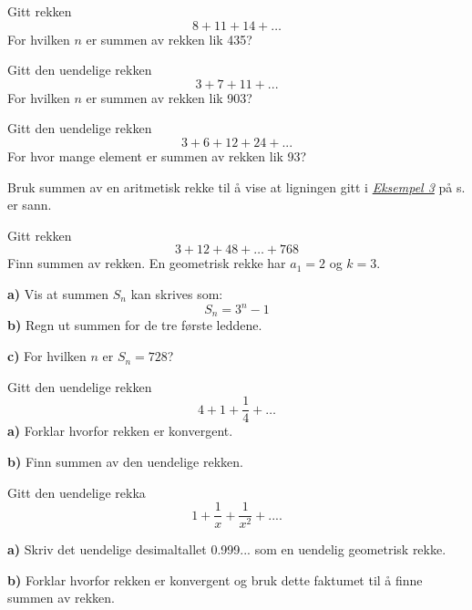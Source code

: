 Gitt rekken 
\[ 8+11+14+\ldots \]
For hvilken $ n $ er summen av rekken lik 435?

Gitt den uendelige rekken
\[ 3+7+11+... \] 
For hvilken $ n $ er summen av rekken lik 903?

Gitt den uendelige rekken
\[ 3+6+12+24+... \]	
For hvor mange element er summen av rekken lik 93?

Bruk summen av en aritmetisk rekke til å vise at ligningen gitt i \hyperref[prodind]{\textsl{Eksempel 3}} på s. \pageref{prodind} er sann.

Gitt rekken
\[ 3+12+48+\ldots+768 \]
Finn summen av rekken. 
\newpage
{}
En geometrisk rekke har $ {a_1 = 2} $ og $ {k=3} $.\os 

\textbf{a)} Vis at summen $ S_n $ kan skrives som:
\[ S_n = 3^n-1 \]
\textbf{b)} Regn ut summen for de tre første leddene.\os

\textbf{c)} For hvilken $ n $ er $ S_n=728 $?



\begin{comment}
\textbf{c)} Hvis du fortsetter å spare slik, og medregner innskudd samme måned, når vil du ha 24200 kr på konto? 
\end{comment}

Gitt den uendelige rekken
\[ 4+1+\frac{1}{4}+\ldots \]
\textbf{a)} Forklar hvorfor rekken er konvergent.\os

\textbf{b)} Finn summen av den uendelige rekken.

Gitt den uendelige rekka 
\[ 1+\frac{1}{x}+\frac{1}{x^2}+.... \]

\begin{comment}
	\op{stav} 
	Tenk at uendelig mange personer skal sette sammen en stav. Første person legger på en meter, neste person legger på 0.1 m, neste legger på 0.01 m osv. Hvor lang blir staven?
\end{comment}
\newpage
{}
\textbf{a)} Skriv det uendelige desimaltallet 0.999... som en uendelig geometrisk rekke.\os

\textbf{b)} Forklar hvorfor rekken er konvergent og bruk dette faktumet til å finne summen av rekken. 

